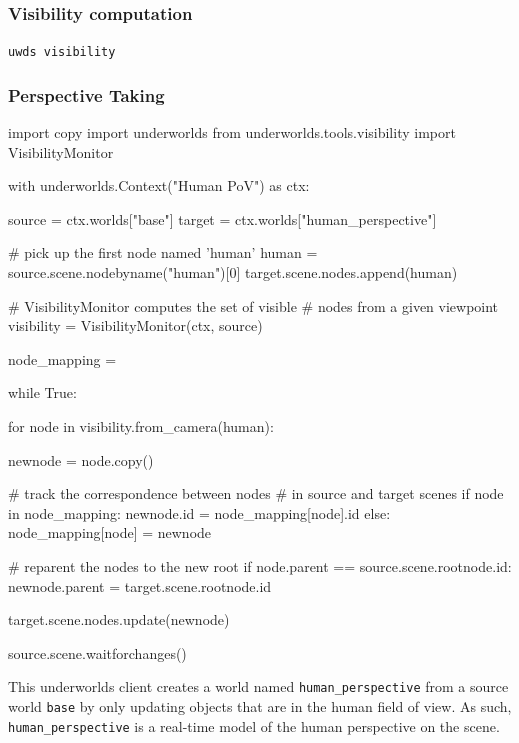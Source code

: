 \documentclass[letterpaper, 10 pt, conference]{ieeeconf}  %
\newcommand{\uwds}{{\sc underworlds}\xspace}
\begin{document}
\cite{Ros2010}

\subsubsection{Visibility computation}

{\tt uwds visibility}

\subsubsection{Perspective Taking}

\begin{listing}[h!]
\begin{pythoncode}
import copy
import underworlds
from underworlds.tools.visibility import VisibilityMonitor

with underworlds.Context("Human PoV") as ctx:

    source = ctx.worlds["base"]
    target = ctx.worlds["human_perspective"]

    # pick up the first node named 'human'
    human = source.scene.nodebyname("human")[0]
    target.scene.nodes.append(human)

    # VisibilityMonitor computes the set of visible 
    # nodes from a given viewpoint
    visibility = VisibilityMonitor(ctx, source)

    node_mapping = {}

    while True:

        for node in visibility.from_camera(human):

            newnode = node.copy()

            # track the correspondence between nodes
            # in source and target scenes
            if node in node_mapping:
                newnode.id = node_mapping[node].id
            else:
                node_mapping[node] = newnode

            # reparent the nodes to the new root
            if node.parent == source.scene.rootnode.id:
                newnode.parent = target.scene.rootnode.id

            target.scene.nodes.update(newnode)

        source.scene.waitforchanges()

\end{pythoncode}
    \caption{This \uwds client creates a world named {\tt human\_perspective}
    from a source world {\tt base} by only updating objects that are in the
    human field of view. As such, {\tt human\_perspective} is a real-time model
    of the human perspective on the scene.}
    
    \label{lst|humanperspective} \end{listing}
\end{document}
